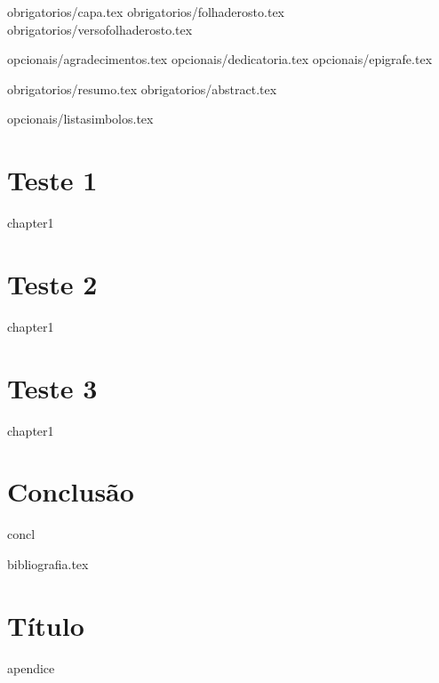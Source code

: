 \documentclass[12pt]{report}
\begin{document}
 {obrigatorios/capa.tex}
 {obrigatorios/folhaderosto.tex}
 {obrigatorios/versofolhaderosto.tex}

 {opcionais/agradecimentos.tex}
 {opcionais/dedicatoria.tex}
 {opcionais/epigrafe.tex}

 {obrigatorios/resumo.tex}
 {obrigatorios/abstract.tex}

 {opcionais/listasimbolos.tex}

\renewcommand*\contentsname{Sumário}
\tableofcontents

\renewcommand*\chaptername{Capítulo}

\chapter{Teste 1}
{chapter1}

\chapter{Teste 2}
{chapter1}

\chapter{Teste 3}
{chapter1}

\chapter{Conclusão}
{concl}

\renewcommand\bibname{Referências}
{bibliografia.tex}

\renewcommand*\appendixname{Ap\^endice}
\appendix
\chapter{Título}
{apendice}
\end{document}
